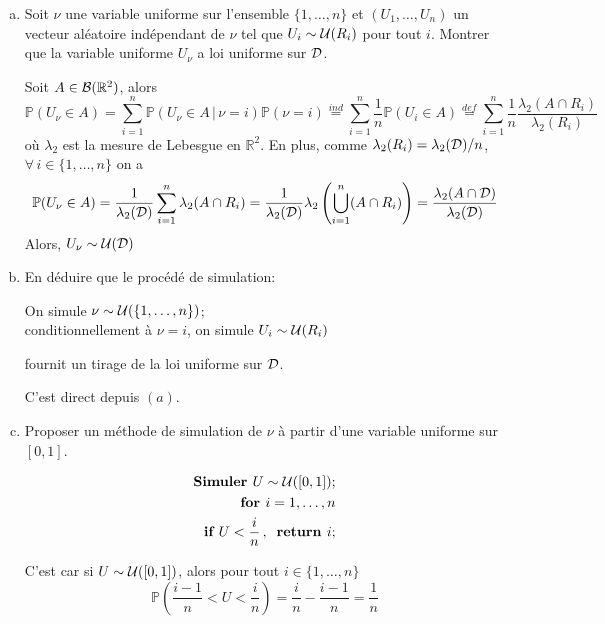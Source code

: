 \documentclass[a4paper]{article}
\begin{document}
\begin{enumerate}[(a)]
\item Soit $\nu$ une variable uniforme sur l'ensemble $\{1,\ldots,n\}$ et $(U_1,\ldots,U_n)$ un vecteur al\'eatoire ind\'ependant de $\nu$ tel que $U_i\sim{\cal U}(R_i)$ pour tout $i$. Montrer que la variable uniforme $U_{\nu}$ a loi uniforme sur ${\cal D}$.

Soit $A\in{\cal B}(\mathbb{R}^2)$, alors
$$\mathbb{P}(U_{\nu}\in A) = \sum\limits_{i=1}^n\mathbb{P}(U_{\nu}\in A\,|\,\nu=i)\mathbb{P}(\nu=i)\stackrel{ind}{=}\sum\limits_{i=1}^n\frac{1}{n}\mathbb{P}(U_i\in A)\stackrel{def}{=}\sum\limits_{i=1}^n\frac{1}{n}\frac{\lambda_2(A\cap R_i)}{\lambda_2(R_i)}$$
o\`u $\lambda_2$ est la mesure de Lebesgue en $\mathbb{R}^2$. En plus, comme $\lambda_2(R_i) = \lambda_2({\cal D})/n$, $\forall\,i\in\{1,\ldots,n\}$ on a
$$\mathbb{P}(U_{\nu}\in A) = \frac{1}{\lambda_2({\cal D})}\sum\limits_{i=1}^n\lambda_2(A\cap R_i) = \frac{1}{\lambda_2({\cal D})}\lambda_2\left(\bigcup\limits_{i=1}^n(A\cap R_i)\right) = \frac{\lambda_2(A\cap{\cal D})}{\lambda_2({\cal D})}$$
Alors, $U_{\nu}\sim{\cal U}({\cal D})$



\item En d\'eduire que le proc\'ed\'e de simulation:

\begin{center}
On simule $\nu\sim{\cal U}(\{1,\ldots,n\})$;\\
conditionnellement \`a $\nu=i$, on simule $U_i\sim{\cal U}(R_i)$
\end{center}
fournit un tirage de la loi uniforme sur ${\cal D}$.

C'est direct depuis $(a)$.


\item Proposer un m\'ethode de simulation de $\nu$ \`a partir d'une variable uniforme sur $[0,1]$.

\begin{align*}
\textbf{Simuler }U\sim{\cal U}([0,1]);\\
\textbf{for }i=1,\ldots,n\\\textbf{if }U<\frac{i}{n}\,,\, \textbf{ return }i;
\end{align*}

C'est car si $U\sim{\cal U}([0,1])$, alors pour tout $i\in\{1,\ldots,n\}$
$$\mathbb{P}\left(\frac{i-1}{n}<U<\frac{i}{n}\right) = \frac{i}{n}-\frac{i-1}{n} = \frac{1}{n}$$

\end{enumerate}
\end{document}
